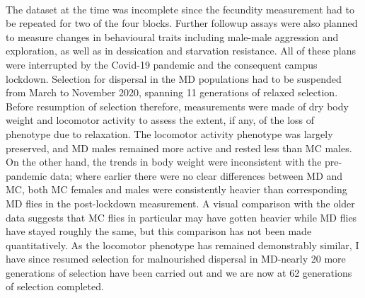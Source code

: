 \documentclass[12pt,onecolumn,twoside]{article}
\begin{document}
	\paragraph{\empty}The dataset at the time was incomplete since the fecundity measurement had to be repeated for two of the four blocks. Further followup assays were also planned to measure changes in behavioural traits including male-male aggression and exploration, as well as in dessication and starvation resistance. %
	All of these plans were interrupted by the Covid-19 pandemic and the consequent campus lockdown. Selection for dispersal in the MD populations had to be suspended from March to November 2020, spanning 11 generations of relaxed selection. Before resumption of selection therefore, measurements were made of dry body weight and locomotor activity to assess the extent, if any, of the loss of phenotype due to relaxation. The locomotor activity phenotype was largely preserved, and MD males remained more active and rested less than MC males. On the other hand, the trends in body weight were inconsistent with the pre-pandemic data; where earlier there were no clear differences between MD and MC, both MC females and males were consistently heavier than corresponding MD flies in the post-lockdown measurement. A visual comparison with the older data suggests that MC flies in particular may have gotten heavier while MD flies have stayed roughly the same, but this comparison has not been made quantitatively. As the locomotor phenotype has remained demonstrably similar, I have since resumed selection for malnourished dispersal in MD-nearly 20 more generations of selection have been carried out and we are now at 62 generations of selection completed.
\end{document}
